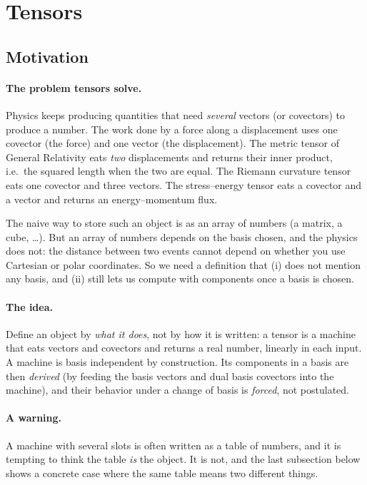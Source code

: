 \documentclass[11pt]{article}
\begin{document}
\section{Tensors}

\subsection*{Motivation}

\paragraph{The problem tensors solve.}
Physics keeps producing quantities that need \emph{several} vectors (or covectors) to produce a number. The work done by a force along a displacement uses one covector (the force) and one vector (the displacement). The metric tensor of General Relativity eats \emph{two} displacements and returns their inner product, i.e.\ the squared length when the two are equal. The Riemann curvature tensor eats one covector and three vectors. The stress--energy tensor eats a covector and a vector and returns an energy--momentum flux.

The naive way to store such an object is as an array of numbers (a matrix, a cube, \dots). But an array of numbers depends on the basis chosen, and the physics does not: the distance between two events cannot depend on whether you use Cartesian or polar coordinates. So we need a definition that (i) does not mention any basis, and (ii) still lets us compute with components once a basis is chosen.

\paragraph{The idea.}
Define an object by \emph{what it does}, not by how it is written: a tensor is a machine that eats vectors and covectors and returns a real number, linearly in each input. A machine is basis independent by construction. Its components in a basis are then \emph{derived} (by feeding the basis vectors and dual basis covectors into the machine), and their behavior under a change of basis is \emph{forced}, not postulated.

\paragraph{A warning.}
A machine with several slots is often written as a table of numbers, and it is tempting to think the table \emph{is} the object. It is not, and the last subsection below shows a concrete case where the same table means two different things.
\end{document}

